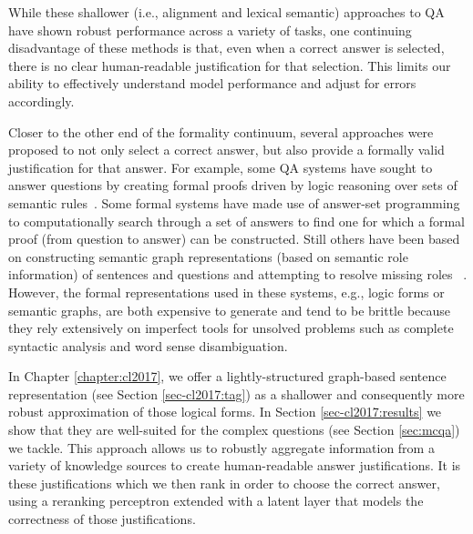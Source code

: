 While these shallower (i.e., alignment and lexical semantic) approaches to QA have shown robust performance across a variety of tasks, one continuing disadvantage of these methods is that, even when a correct answer is selected, there is no clear human-readable justification for that selection.  This limits our ability to effectively understand model performance and adjust for errors accordingly.

Closer to the other end of the formality continuum, several approaches were proposed to not only select a correct answer, but also provide a formally valid justification for that answer.  For example, some QA systems have sought to answer questions by creating formal proofs driven by logic reasoning over sets of semantic rules~\citep[e.g.,][]{moldovan2003cogex,moldovan2007cogex,
balduccini2008knowledge,
maccartney2009natural,liang2013learning,
lewis2013combining}.
Some formal systems have made use of answer-set programming \citep{baral2006using,baral2011towards,baral2012answering,
baral2012knowledge} to computationally search through a set of answers to find one for which a formal proof (from question to answer) can be constructed. 
Still others have been based on constructing semantic graph representations (based on semantic role information) of sentences and questions and attempting to resolve missing roles ~\citep{banarescu2012amr,sharmatowards}. 
However, the formal representations used in these systems, e.g., logic forms or semantic graphs, are both expensive to generate and tend to be brittle because they rely extensively on imperfect tools for unsolved problems such as complete syntactic analysis and word sense disambiguation.  %

In Chapter \ref{chapter:cl2017}, we offer a lightly-structured graph-based sentence representation (see Section \ref{sec-cl2017:tag}) as a shallower and consequently more robust approximation of those logical forms.  In Section \ref{sec-cl2017:results} we show that they are well-suited for the complex questions (see Section \ref{sec:mcqa}) we tackle.
This approach allows us to robustly aggregate information from a variety of knowledge sources to create human-readable answer justifications.  
It is these justifications which we then rank in order to choose the correct answer, using a reranking perceptron extended with a latent layer that models the correctness of those justifications.

